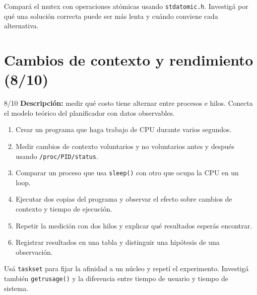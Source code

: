 \documentclass[11pt,a4paper]{article}
\begin{document}
\begin{extrabox}
Compará el mutex con operaciones atómicas usando \texttt{stdatomic.h}. Investigá por qué una solución correcta puede ser más lenta y cuándo conviene cada alternativa.
\end{extrabox}

\newpage
\section{Cambios de contexto y rendimiento (8/10)}

\begin{trackbox}{8/10}
\textbf{Descripción:} medir qué costo tiene alternar entre procesos e hilos. Conecta el modelo teórico del planificador con datos observables.
\end{trackbox}

\begin{enumerate}
  \item Crear un programa que haga trabajo de CPU durante varios segundos.
  \item Medir cambios de contexto voluntarios y no voluntarios antes y después usando \texttt{/proc/PID/status}.
  \item Comparar un proceso que usa \texttt{sleep()} con otro que ocupa la CPU en un loop.
  \item Ejecutar dos copias del programa y observar el efecto sobre cambios de contexto y tiempo de ejecución.
  \item Repetir la medición con dos hilos y explicar qué resultados esperás encontrar.
  \item Registrar resultados en una tabla y distinguir una hipótesis de una observación.
\end{enumerate}

\begin{pointsextrabox}
Usá \texttt{taskset} para fijar la afinidad a un núcleo y repetí el experimento. Investigá también \texttt{getrusage()} y la diferencia entre tiempo de usuario y tiempo de sistema.
\end{pointsextrabox}
\end{document}
